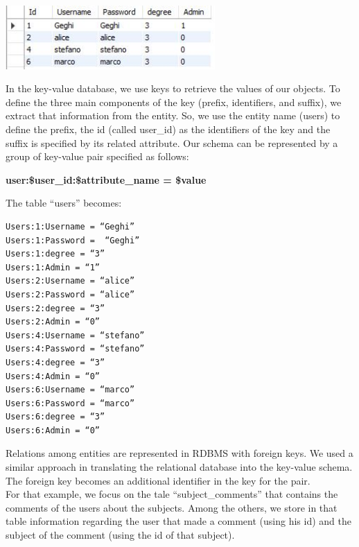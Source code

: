 \documentclass[a4paper, oneside]{article}
\begin{document}
\begin{minipage}{\linewidth}
\begin{center}
\vspace{4mm}
\includegraphics[width = 0.6\textwidth]{./images/table/users} 
\vspace{2mm}
\label{fig:tableUsers}
\end{center}
\vspace{3mm}
\end{minipage}
In the key-value database, we use keys to retrieve the values of our objects. To define the three main components of the key (prefix, identifiers, and suffix), we extract that information from the entity. So, we use the entity name (users) to define the prefix, the id (called user\_id) as the identifiers of the key and the suffix is specified by its related attribute. Our schema can be represented by a group of key-value pair specified as follows:\\
\begin{center}
	\textbf{user:\$user\_id:\$attribute\_name = \$value}
\end{center}
\vspace{5mm}
The table “users” becomes:
\begin{verbatim}
Users:1:Username = “Geghi”
Users:1:Password =  “Geghi”
Users:1:degree = “3”
Users:1:Admin = “1”
Users:2:Username = “alice”
Users:2:Password = “alice”
Users:2:degree = “3”
Users:2:Admin = “0”
Users:4:Username = “stefano”
Users:4:Password = “stefano”
Users:4:degree = “3”
Users:4:Admin = “0”
Users:6:Username = “marco”
Users:6:Password = “marco”
Users:6:degree = “3”
Users:6:Admin = “0”
\end{verbatim}
\vspace{2mm} 
Relations among entities are represented in RDBMS with foreign keys. We used a similar approach in translating the relational database into the key-value schema. The foreign key becomes an additional identifier in the key for the pair.\\
For that example, we focus on the tale “subject\_comments” that contains the comments of the users about the subjects. Among the others, we store in that table information regarding the user that made a comment (using his id) and the subject of the comment (using the id of that subject).\\
\end{document}
